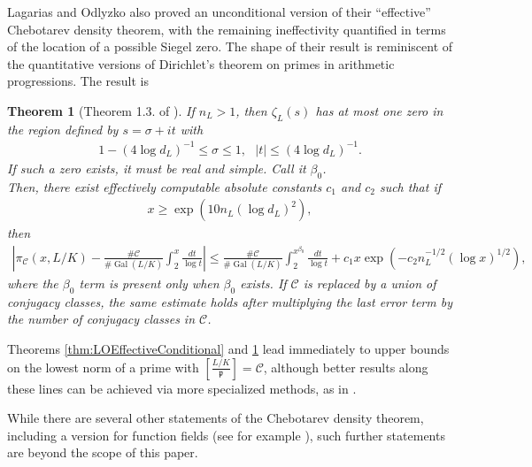 \documentclass[12pt]{amsart}
\newtheorem{thm}{Theorem}[section]
\theoremstyle{definition}
\theoremstyle{remark}
\numberwithin{equation}{section}
\newcommand{\cC}{\mathcal C}
\newcommand{\fkp}{\mathfrak p}
\newcommand{\bbQ}{\mathbb Q}
\newcommand{\inv}{^{-1}}
\newcommand{\artin}[2]{\left[ \frac{#1}{#2}\right]}
\DeclareMathOperator{\Gal}{Gal}
\begin{document}
Lagarias and Odlyzko also proved an unconditional version of their ``effective'' Chebotarev density theorem, with the remaining ineffectivity quantified in terms of the location of a possible Siegel zero. The shape of their result is reminiscent of the quantitative versions of Dirichlet's theorem on primes in arithmetic progressions. The result is 
\begin{thm}[Theorem 1.3. of \cite{LagariasOdlyzko77}]\label{thm:LOEffectiveUnconditional}
If $n_{L} > 1$, then $\zeta_{L}(s)$ has at most one zero in the region defined by $s = \sigma + it$ with 
\begin{align}
1 - (4 \log d_{L})\inv \leq \sigma \leq 1, \ \ \ |t| \leq (4 \log d_L)\inv.
\end{align}
If such a zero exists, it must be real and simple. Call it $\beta_{0}$.\\
Then, there exist effectively computable absolute constants $c_{1}$ and $c_{2}$ such that if 
\begin{align}
x \geq \exp(10 n_{L} (\log d_L)^2),
\end{align}
then
\begin{align}
\left| \pi_{\cC}(x, L/K) - \frac{\# \cC}{\# \Gal(L/K)} \int_{2}^{x} \frac{dt}{\log t} \right| \leq \frac{\# \cC}{\# \Gal(L/K)} \int_{2}^{x^{\beta_{0}}} \frac{dt}{\log t} + c_{1} x \exp\left(- c_2 n_{L}^{-1/2} (\log x)^{1/2}\right),
\end{align}
where the $\beta_{0}$ term is present only when $\beta_{0}$ exists. If $\cC$ is replaced by a union of conjugacy classes, the same estimate holds after multiplying the last error term by the number of conjugacy classes in $\cC$.
\end{thm}

Theorems \ref{thm:LOEffectiveConditional} and \ref{thm:LOEffectiveUnconditional} lead immediately to upper bounds on the lowest norm of a prime with $\artin{L/K}{\fkp} = \cC$, although better results along these lines can be achieved via more specialized methods, as in \cite{LagariasMontgomeryOdlyzko79}.

While there are several other statements of the Chebotarev density theorem, including a version for function fields (see for example \cite{FriedJarden08}), such further statements are beyond the scope of this paper.


\end{document}
